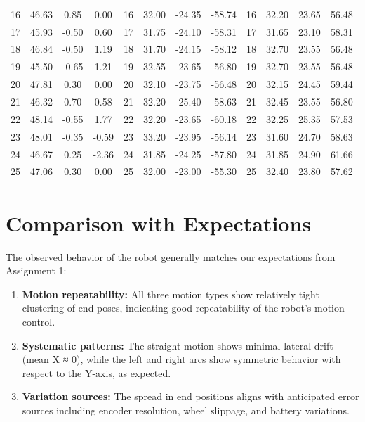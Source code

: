 \begin{table}[htbp]
{\begin{tabular}{|c|c|c|c||c|c|c|c||c|c|c|c|}
16 & 46.63 & 0.85 & 0.00 & 16 & 32.00 & -24.35 & -58.74 & 16 & 32.20 & 23.65 & 56.48 \\
17 & 45.93 & -0.50 & 0.60 & 17 & 31.75 & -24.10 & -58.31 & 17 & 31.65 & 23.10 & 58.31 \\
18 & 46.84 & -0.50 & 1.19 & 18 & 31.70 & -24.15 & -58.12 & 18 & 32.70 & 23.55 & 56.48 \\
19 & 45.50 & -0.65 & 1.21 & 19 & 32.55 & -23.65 & -56.80 & 19 & 32.70 & 23.55 & 56.48 \\
20 & 47.81 & 0.30 & 0.00 & 20 & 32.10 & -23.75 & -56.48 & 20 & 32.15 & 24.45 & 59.44 \\
21 & 46.32 & 0.70 & 0.58 & 21 & 32.20 & -25.40 & -58.63 & 21 & 32.45 & 23.55 & 56.80 \\
22 & 48.14 & -0.55 & 1.77 & 22 & 32.20 & -23.65 & -60.18 & 22 & 32.25 & 25.35 & 57.53 \\
23 & 48.01 & -0.35 & -0.59 & 23 & 33.20 & -23.95 & -56.14 & 23 & 31.60 & 24.70 & 58.63 \\
24 & 46.67 & 0.25 & -2.36 & 24 & 31.85 & -24.25 & -57.80 & 24 & 31.85 & 24.90 & 61.66 \\
25 & 47.06 & 0.30 & 0.00 & 25 & 32.00 & -23.00 & -55.30 & 25 & 32.40 & 23.80 & 57.62 \\
\hline
\end{tabular}%
}
\end{table}

\newpage
\clearpage
\section{Comparison with Expectations}

The observed behavior of the robot generally matches our expectations from Assignment 1:

\begin{enumerate}
    
    \item \textbf{Motion repeatability:} All three motion types show relatively tight clustering of end poses, indicating good repeatability of the robot's motion control.
    
    \item \textbf{Systematic patterns:} The straight motion shows minimal lateral drift (mean X ≈ 0), while the left and right arcs show symmetric behavior with respect to the Y-axis, as expected.
    
    \item \textbf{Variation sources:} The spread in end positions aligns with anticipated error sources including encoder resolution, wheel slippage, and battery variations.
\end{enumerate}

